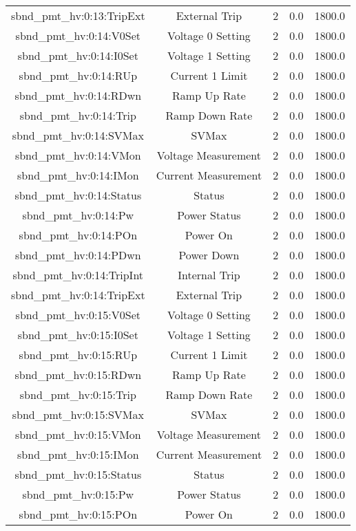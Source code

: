 \begin{table}[ptb]
\begin{tabular}{c | c c c c}
sbnd_pmt_hv:0:13:TripExt & External Trip & 2 & 0.0 & 1800.0\\ 
sbnd_pmt_hv:0:14:V0Set & Voltage 0 Setting & 2 & 0.0 & 1800.0\\ 
sbnd_pmt_hv:0:14:I0Set & Voltage 1 Setting & 2 & 0.0 & 1800.0\\ 
sbnd_pmt_hv:0:14:RUp & Current 1 Limit & 2 & 0.0 & 1800.0\\ 
sbnd_pmt_hv:0:14:RDwn & Ramp Up Rate & 2 & 0.0 & 1800.0\\ 
sbnd_pmt_hv:0:14:Trip & Ramp Down Rate & 2 & 0.0 & 1800.0\\ 
sbnd_pmt_hv:0:14:SVMax & SVMax & 2 & 0.0 & 1800.0\\ 
sbnd_pmt_hv:0:14:VMon & Voltage Measurement & 2 & 0.0 & 1800.0\\ 
sbnd_pmt_hv:0:14:IMon & Current Measurement & 2 & 0.0 & 1800.0\\ 
sbnd_pmt_hv:0:14:Status & Status & 2 & 0.0 & 1800.0\\ 
sbnd_pmt_hv:0:14:Pw & Power Status & 2 & 0.0 & 1800.0\\ 
sbnd_pmt_hv:0:14:POn & Power On & 2 & 0.0 & 1800.0\\ 
sbnd_pmt_hv:0:14:PDwn & Power Down & 2 & 0.0 & 1800.0\\ 
sbnd_pmt_hv:0:14:TripInt & Internal Trip & 2 & 0.0 & 1800.0\\ 
sbnd_pmt_hv:0:14:TripExt & External Trip & 2 & 0.0 & 1800.0\\ 
sbnd_pmt_hv:0:15:V0Set & Voltage 0 Setting & 2 & 0.0 & 1800.0\\ 
sbnd_pmt_hv:0:15:I0Set & Voltage 1 Setting & 2 & 0.0 & 1800.0\\ 
sbnd_pmt_hv:0:15:RUp & Current 1 Limit & 2 & 0.0 & 1800.0\\ 
sbnd_pmt_hv:0:15:RDwn & Ramp Up Rate & 2 & 0.0 & 1800.0\\ 
sbnd_pmt_hv:0:15:Trip & Ramp Down Rate & 2 & 0.0 & 1800.0\\ 
sbnd_pmt_hv:0:15:SVMax & SVMax & 2 & 0.0 & 1800.0\\ 
sbnd_pmt_hv:0:15:VMon & Voltage Measurement & 2 & 0.0 & 1800.0\\ 
sbnd_pmt_hv:0:15:IMon & Current Measurement & 2 & 0.0 & 1800.0\\ 
sbnd_pmt_hv:0:15:Status & Status & 2 & 0.0 & 1800.0\\ 
sbnd_pmt_hv:0:15:Pw & Power Status & 2 & 0.0 & 1800.0\\ 
sbnd_pmt_hv:0:15:POn & Power On & 2 & 0.0 & 1800.0\\ 

\end{tabular}
\end{table}
